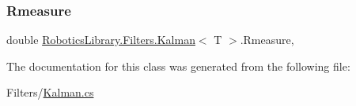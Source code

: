 \mbox{\label{class_robotics_library_1_1_filters_1_1_kalman_abb21b31283beac465da9fe1c947a52cf}} 
\subsubsection{\texorpdfstring{Rmeasure}{Rmeasure}}
{\footnotesize\ttfamily double \hyperlink{class_robotics_library_1_1_filters_1_1_kalman}{Robotics\+Library.\+Filters.\+Kalman}$<$ T $>$.Rmeasure\hspace{0.3cm}{\ttfamily [get]}, {\ttfamily [set]}}



The documentation for this class was generated from the following file\+:\begin{DoxyCompactItemize}
\item 
Filters/\hyperlink{_kalman_8cs}{Kalman.\+cs}\end{DoxyCompactItemize}
